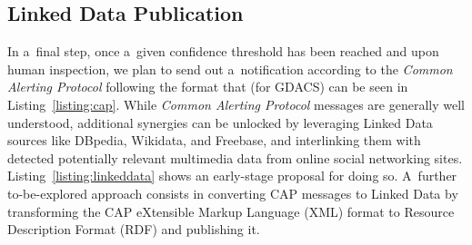 \documentclass[letterpaper]{article}
\begin{document}
\subsection{Linked Data Publication}

In a~final step, once a~given confidence threshold has been reached
and upon human inspection, we plan to send out a~notification
according to the \emph{Common Alerting Protocol}
following the format that (for GDACS) can be seen in Listing~\ref{listing:cap}.
While \emph{Common Alerting Protocol} messages are generally well understood,
additional synergies can be unlocked by leveraging Linked Data sources
like DBpedia, Wikidata, and Freebase, and interlinking them with detected
potentially relevant multimedia data from online social networking sites.
Listing~\ref{listing:linkeddata} shows an early-stage proposal for doing so. 
A~further to-be-explored approach consists in converting CAP messages to
Linked Data by transforming the CAP eXtensible Markup Language (XML) format
to Resource Description Format (RDF) and publishing it.
\end{document}
